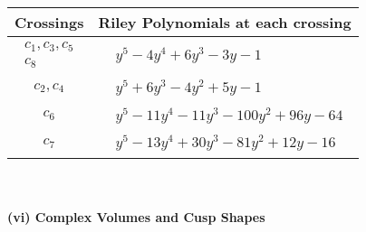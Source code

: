\documentclass[1p]{elsarticle_modified}
\theoremstyle{definition}
\begin{document}
\begin{tabular}{m{50pt}|m{274pt}}
Crossings & \hspace{64pt}Riley Polynomials at each crossing \\
\hline $$\begin{aligned}c_{1},c_{3},c_{5}\\c_{8}\end{aligned}$$&$\begin{aligned}
&y^5-4 y^4+6 y^3-3 y-1
\end{aligned}$\\
\hline $$\begin{aligned}c_{2},c_{4}\end{aligned}$$&$\begin{aligned}
&y^5+6 y^3-4 y^2+5 y-1
\end{aligned}$\\
\hline $$\begin{aligned}c_{6}\end{aligned}$$&$\begin{aligned}
&y^5-11 y^4-11 y^3-100 y^2+96 y-64
\end{aligned}$\\
\hline $$\begin{aligned}c_{7}\end{aligned}$$&$\begin{aligned}
&y^5-13 y^4+30 y^3-81 y^2+12 y-16
\end{aligned}$\\
\hline
\end{tabular}\\~\\
\newpage\flushleft \textbf{(vi) Complex Volumes and Cusp Shapes}
\end{document}
